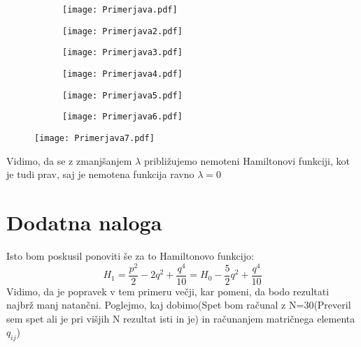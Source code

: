 \documentclass{article}
\begin{document}
\begin{figure}[H]
\begin{subfigure}{.5\textwidth}
\texttt{[image: Primerjava.pdf]}
\end{subfigure}
\begin{subfigure}{.5\textwidth}
\texttt{[image: Primerjava2.pdf]}
\end{subfigure}
\end{figure}
\begin{figure}[H]
\begin{subfigure}{.5\textwidth}
\texttt{[image: Primerjava3.pdf]}
\end{subfigure}
\begin{subfigure}{.5\textwidth}
\texttt{[image: Primerjava4.pdf]}
\end{subfigure}
\end{figure}
\begin{figure}[H]
\begin{subfigure}{.5\textwidth}
\texttt{[image: Primerjava5.pdf]}
\end{subfigure}
\begin{subfigure}{.5\textwidth}
\texttt{[image: Primerjava6.pdf]}
\end{subfigure}
\end{figure}
\begin{figure}[H]
\texttt{[image: Primerjava7.pdf]}
\end{figure}

Vidimo, da se z zmanjšanjem $\lambda$ približujemo nemoteni Hamiltonovi funkciji, kot je tudi prav, saj je nemotena funkcija ravno $\lambda=0$
\newpage
\section{Dodatna naloga}

Isto bom poskusil ponoviti še za to Hamiltonovo funkcijo:
\begin{equation*}
H_1 = \frac{p^2}{2} - 2q^2 + \frac{q^4}{10} = H_0 - \frac{5}{2}q^2 + \frac{q^4}{10}
\end{equation*}
Vidimo, da je popravek v tem primeru večji, kar pomeni, da bodo rezultati najbrž manj natančni. Poglejmo, kaj dobimo(Spet bom računal z N=30(Preveril sem spet ali je pri višjih N rezultat isti in je) in računanjem matričnega elementa $q_{ij}$)
\end{document}
